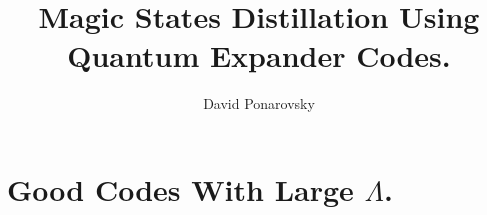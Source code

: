 \documentclass[manuscript,screen,review]{acmart}
\begin{document}

\title{Magic States Distillation Using Quantum Expander Codes. } 
\author{David Ponarovsky}
\maketitle




%
%

\section{Good Codes With Large $\Lambda$.}
\newcommand*{\DETAILS}{}
\ifdefined\DETAILS
\end{document}
